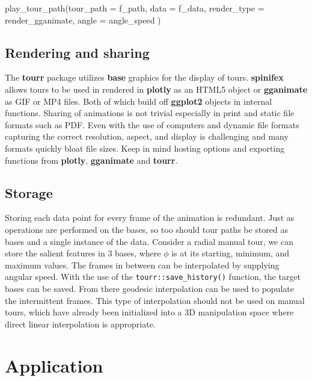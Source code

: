\begin{Schunk}
\begin{Sinput}
play_tour_path(tour_path = f_path,
               data = f_data,
               render_type = render_gganimate, 
               angle = angle_speed
)
\end{Sinput}
\end{Schunk}

\hypertarget{rendering-and-sharing}{%
\subsection{Rendering and sharing}\label{rendering-and-sharing}}

The \textbf{tourr} package utilizes \textbf{base} graphics for the
display of tours. \textbf{spinifex} allows tours to be used in rendered
in \textbf{plotly} as an HTML5 object or \textbf{gganimate} as GIF or
MP4 files. Both of which build off \textbf{ggplot2} objects in internal
functions. Sharing of animations is not trivial especially in print and
static file formats such as PDF. Even with the use of computers and
dynamic file formats capturing the correct resolution, aspect, and
display is challenging and many formats quickly bloat file sizes. Keep
in mind hosting options and exporting functions from \textbf{plotly},
\textbf{gganimate} and \textbf{tourr}.

\hypertarget{storage}{%
\subsection{Storage}\label{storage}}

Storing each data point for every frame of the animation is redundant.
Just as operations are performed on the bases, so too should tour paths
be stored as bases and a single instance of the data. Consider a radial
manual tour, we can store the salient features in 3 bases, where
\(\phi\) is at its starting, minimum, and maximum values. The frames in
between can be interpolated by supplying angular speed. With the use of
the \texttt{tourr::save\_history()} function, the target bases can be
saved. From there geodesic interpolation can be used to populate the
intermittent frames. This type of interpolation should not be used on
manual tours, which have already been initialized into a 3D manipulation
space where direct linear interpolation is appropriate.

\hypertarget{sec:application}{%
\section{Application}\label{sec:application}}

